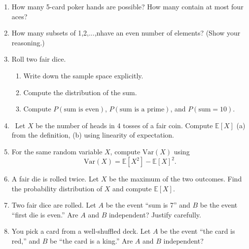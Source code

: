 \begin{enumerate}
\begin{enumerate}
    \item What is the probability that all $n$ students have \emph{different} last digits?  
          (Express the answer as a product.)
    \item Evaluate this probability for $n=5$ and for $n=10$.
    \item For what smallest $n$ is this probability less than $0.5$?
\end{enumerate}

\item 
How many 5-card poker hands are possible?  
How many contain at most four aces?

\item How many subsets of {1,2,...,n}have an even number of elements? (Show your reasoning.)

\item 
Roll two fair dice.  
\begin{enumerate}
    \item Write down the sample space explicitly.  
    \item Compute the distribution of the sum.  
    \item Compute $P(\text{sum is even})$, $P(\text{sum is a prime})$, and $P(\text{sum}=10)$.  
\end{enumerate}

\item \
Let $X$ be the number of heads in 4 tosses of a fair coin.  
Compute $\mathbb{E}[X]$ (a) from the definition, (b) using linearity of expectation.

\item 
For the same random variable $X$, compute $\mathrm{Var}(X)$ using  
\[
\mathrm{Var}(X)=\mathbb{E}[X^2]-\mathbb{E}[X]^2.
\]

\item  
A fair die is rolled twice.  
Let $X$ be the maximum of the two outcomes.  
Find the probability distribution of $X$ and compute $\mathbb{E}[X]$.

\item 
Two fair dice are rolled.  
Let $A$ be the event “sum is 7” and $B$ be the event “first die is even.”  
Are $A$ and $B$ independent? Justify carefully.

\item  
You pick a card from a well-shuffled deck.  
Let $A$ be the event “the card is red,” and $B$ be “the card is a king.”  
Are $A$ and $B$ independent?


\end{enumerate}
